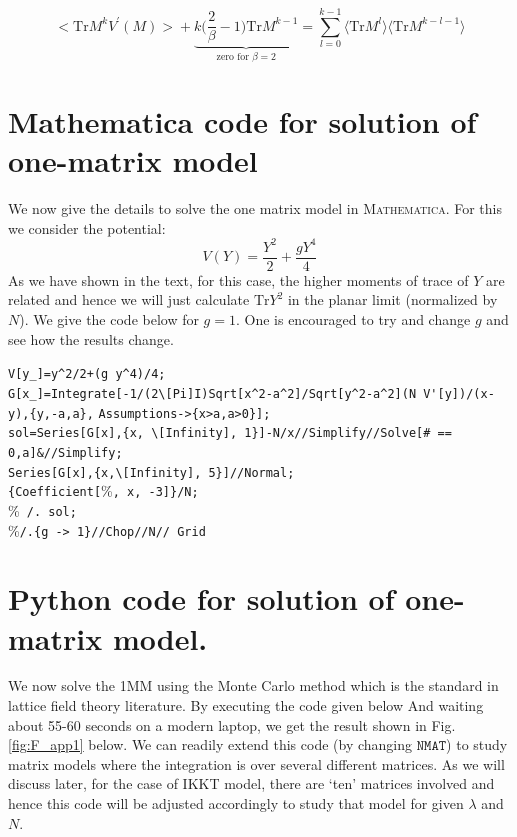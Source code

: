 \documentclass[11pt]{article}
\begin{document}
\begin{equation}
		\Big< \mathrm{Tr} M^{k} V^{\prime}(M) \Big> +  \underbrace{k \Bigg(\frac{2}{\beta} - 1 \Bigg) \mathrm{Tr} M^{k-1}}_{\text{zero for $\beta=2$}} = \sum_{l=0}^{k-1} \langle \mathrm{Tr} M^{l} \rangle  \langle \mathrm{Tr} M^{k-l-1} \rangle
\end{equation}


\section{Mathematica code for solution of one-matrix model}

We now give the details to solve the one matrix model in \textsc{Mathematica}. For this we consider the potential:
\[ V(Y) = \frac{Y^2}{2} + \frac{gY^4}{4} \] 
As we have shown in the text, for this case, the higher moments of trace of $Y$ are related and hence we will just calculate $\mbox{Tr}Y^2$ in the planar limit (normalized by $N$). We give the code below for $g=1$. One is encouraged to try and change $g$ and see how the results change.

\begin{mdframed}[backgroundcolor=magenta!1] 
	\begin{footnotesize} 
		\noindent 
		\verb"V[y_]=y^2/2+(g y^4)/4;"\\
		\verb"G[x_]=Integrate[-1/(2\[Pi]I)Sqrt[x^2-a^2]/Sqrt[y^2-a^2](N V'[y])/(x-y),{y,-a,a}," \newline
		\verb"Assumptions->{x>a,a>0}];"\\
		\verb"sol=Series[G[x],{x, \[Infinity], 1}]-N/x//Simplify//Solve[# == 0,a]&//Simplify; "\\
		\verb"Series[G[x],{x,\[Infinity], 5}]//Normal; "\\
		\verb"{Coefficient["\%\verb", x, -3]}/N;"\\
		\%\verb" /. sol;"\\
		\%\verb"/.{g -> 1}//Chop//N// Grid"\\
	\end{footnotesize} 
\end{mdframed}


\section{Python code for solution of one-matrix model.}
We now solve the 1MM using the Monte Carlo method which is the 
standard in lattice field theory literature. By executing the code given below
And waiting about 55-60 seconds on a modern laptop, we get the result shown in 
Fig. \ref{fig:F_app1} below. We can readily extend this code (by changing $\texttt{NMAT}$) to study matrix models where the integration is over several different matrices. As we will discuss later, for the case of IKKT model, there are `ten' matrices involved and hence this code will be adjusted accordingly to study that model for given $\lambda$ and $N$. 
\end{document}
